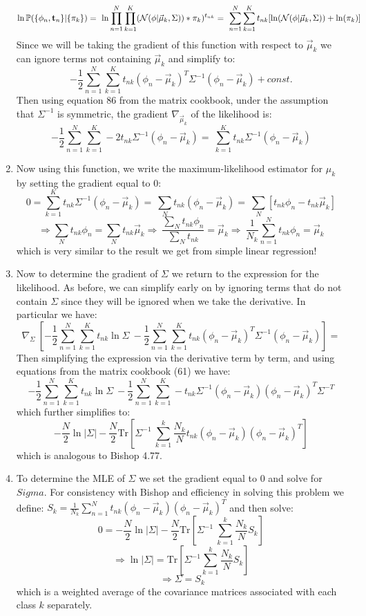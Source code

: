 \documentclass[submit]{harvardml}
\begin{document}
\begin{enumerate}
	\[
	\ln \mathbb{P}(\{\phi_n, {\bf t}_n \} | \{\pi_k \}) = \
	\ln \prod_{n=1}^{N} \prod_{k=1}^{K} (\mathcal{N}(\phi | \vec \mu_k, \Sigma)) * \pi_k)^{t_{nk}}	= \
	\sum_{n=1}^{N}\sum_{k=1}^{K} t_{nk} [\ln (\mathcal{N}(\phi | \vec \mu_k, \Sigma)) + \ln (\pi_k)] \	
	\]
	Since we will be taking the gradient of this function with respect to $\vec \mu_k$ we can ignore terms not containing $\vec \mu_k$ and simplify to:
	\[
	-\frac{1}{2} \sum_{n=1}^{N}\sum_{k=1}^{K} t_{nk} (\phi_n - \vec \mu_k)^T \Sigma^{-1} (\phi_n - \vec \mu_k) + const. \
	\]
	Then using equation 86 from the matrix cookbook, under the assumption that $\Sigma^{-1}$ is symmetric, the gradient $\nabla_{\vec \mu_k}$ of the likelihood is:
	\[
	-\frac{1}{2} \sum_{n=1}^{N}\sum_{k=1}^{K}-2t_{nk}\Sigma^{-1}(\phi_n - \vec \mu_k)  = \
	\sum_{k=1}^{K}t_{nk}\Sigma^{-1}(\phi_n - \vec \mu_k) \
	\]
	\item Now using this function, we write the maximum-likelihood estimator for $\mu_k$ by setting the gradient equal to 0:
	\[
	0 = \sum_{k=1}^{K}t_{nk}\Sigma^{-1}(\phi_n - \vec \mu_k) = \
	\sum_N t_{nk} (\phi_n - \vec \mu_k) = \
	\sum_N [t_{nk}\phi_n - t_{nk} \vec \mu_k] \
	\]
	\[
	\Rightarrow \sum_N t_{nk}\phi_n = \sum_N t_{nk} \vec \mu_k \Rightarrow \
	\frac{\sum_N t_{nk}\phi_n}{\sum_N t_{nk}} = \vec \mu_k \Rightarrow \
	\frac{1}{N_k} \sum_{n=1}^{N}  t_{nk}\phi_n = \vec\mu_k \
	\]
	which is very similar to the result we get from simple linear regression!
	\item Now to determine the gradient of $\Sigma$ we return to the expression for the likelihood. As before, we can simplify early on by ignoring terms that do not contain $\Sigma$ since they will be ignored when we take the derivative. In particular we have:
	\[
	\nabla_\Sigma \
	[-\frac{1}{2} \sum_{n=1}^{N}\sum_{k=1}^{K} t_{nk} \ln \Sigma \ 
	-\frac{1}{2} \sum_{n=1}^{N}\sum_{k=1}^{K} t_{nk} (\phi_n - \vec \mu_k)^T \Sigma^{-1} (\phi_n - \vec \mu_k)]  = \
	\]
	Then simplifying the expression via the derivative term by term, and using equations from the matrix cookbook (61) we have:
	\[
	-\frac{1}{2} \sum_{n=1}^{N}\sum_{k=1}^{K} t_{nk} \ln \Sigma \
	-\frac{1}{2} \sum_{n=1}^{N}\sum_{k=1}^{K} -t_{nk} \Sigma^{-1} (\phi_n - \vec \mu_k) (\phi_n - \vec \mu_k)^T \Sigma^{-T} \
	\]
	which further simplifies to:
	\[
	-\frac{N}{2} \ln |\Sigma| -\frac{N}{2} \text{Tr} [\Sigma^{-1} \
	\sum_{k=1}^{k} \frac{N_k}{N} t_{nk} (\phi_n - \vec \mu_k) (\phi_n - \vec \mu_k)^T] \
	\]
	which is analogous to Bishop 4.77.
	\item To determine the MLE of $\Sigma$ we set the gradient equal to 0 and solve for $Sigma$. For consistency with Bishop and efficiency in solving this problem we define: $S_k = \frac{1}{N_k} \sum_{n=1}^{N} t_{nk} (\phi_n - \vec \mu_k) (\phi_n - \vec \mu_k)^T$ and then solve:
	\[
	0 = -\frac{N}{2} \ln |\Sigma| -\frac{N}{2} \text{Tr} [\Sigma^{-1} \
	\sum_{k=1}^{k} \frac{N_k}{N} S_k] \
	\]
	\[
	\Rightarrow \ln |\Sigma| = \text{Tr} [\Sigma^{-1} \sum_{k=1}^{k} \frac{N_k}{N} S_k] \
	\]
	\[
	\Rightarrow \Sigma = S_k
	\]
	which is a weighted average of the covariance matrices associated with each class $k$ separately.
\end{enumerate}
\end{document}
